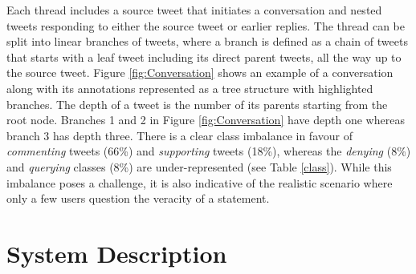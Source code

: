 \documentclass[11pt,a4paper]{article}
\begin{document}
Each thread includes a source tweet that initiates a conversation and nested tweets responding to either the source tweet or earlier replies.  The thread can be split into linear branches of tweets, where a branch is defined as a chain of tweets that starts with a leaf tweet including its direct parent tweets, all the way up to the source tweet. Figure \ref{fig:Conversation} shows an example of a conversation along with its annotations represented as a tree structure with highlighted branches. The depth of a tweet is the number of its parents starting from the root node. Branches 1 and 2 in Figure \ref{fig:Conversation} have depth one whereas branch 3 has depth three.
There is a clear class imbalance in favour of \textit{commenting}  tweets (66\%) and \textit{supporting} tweets (18\%), whereas the \textit{denying} (8\%) and \textit{querying} classes (8\%) are under-represented (see Table \ref{class}). While this imbalance poses a challenge, it is also indicative of the realistic scenario where only a few users question the veracity of a statement. 
 
\section{System Description}
\end{document}
